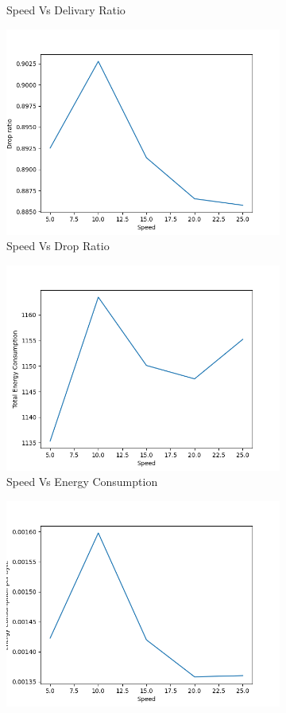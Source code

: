 \begin{figure}[h]
\begin{subfigure}{.5\textwidth}
     \caption{Speed Vs Delivary Ratio}
     \label{speed_delivery_mobile}
\end{subfigure}
\begin{subfigure}{.5\textwidth}
  \centering
  \includegraphics[width=.8\linewidth]{_11_2_mobile/SpeedvsDropRatio.png}
     \caption{Speed Vs Drop Ratio}
     \label{speed_drop_mobile}
\end{subfigure}
\begin{subfigure}{.5\textwidth}
  \centering
  \includegraphics[width=.8\linewidth]{_11_2_mobile/SpeedvsTotalEnergyConsumption.png}
     \caption{Speed Vs Energy Consumption}
     \label{speed_energy_mobile}
\end{subfigure}
\begin{subfigure}{.5\textwidth}
  \centering
  \includegraphics[width=.8\linewidth]{_11_2_mobile/SpeedvsEnergyConsumptionperByte.png}

\end{subfigure}
\end{figure}
